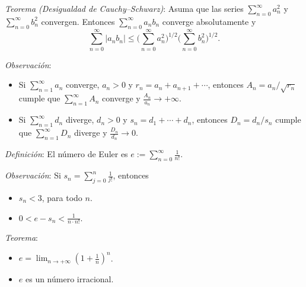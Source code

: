 \documentclass{beamer}
\begin{document}
  \begin{frame}
    \textit{Teorema (Desigualdad de Cauchy--Schwarz)}: Asuma que las series
    $\sum_{n=0}^{\infty} a_n^2$ y $\sum_{n=0}^{\infty} b_n^2$ convergen. Entonces
    $\sum_{n=0}^{\infty} a_n b_n$ converge absolutamente y
    \[
      \sum_{n=0}^{\infty} |a_n b_n| \leq
      \Big( \sum_{n=0}^{\infty} a_n^2 \Big)^{1/2}
      \Big( \sum_{n=0}^{\infty} b_n^2 \Big)^{1/2}.
    \]
    \pause

    \textit{Observación}:
    \begin{itemize}[<+->]
      \item Si $\sum_{n=1}^{\infty} a_n$ converge, $a_n > 0$ y
        $r_n = a_n + a_{n+1} + \cdots$, entonces $A_n = a_n/\sqrt{r_n}$ cumple
        que $\sum_{n=1}^{\infty} A_n$ converge y $\frac{A_n}{a_n} \to +\infty$.
      \item Si $\sum_{n=1}^{\infty} d_n$ diverge, $d_n > 0$ y
        $s_n = d_1 + \cdots + d_n$, entonces $D_n = d_n/s_n$ cumple que
        $\sum_{n=1}^{\infty} D_n$ diverge y $\frac{D_n}{d_n} \to 0$.
    \end{itemize}
  \end{frame}

  \begin{frame}
    \textit{Definición}: El número de Euler es
    $e := \sum_{n=0}^{\infty} \frac{1}{n!}$.
    \newline\newline
    \pause

    \textit{Observación}: Si $s_n = \sum_{j=0}^{n} \frac{1}{j!}$, entonces
    \begin{itemize}[<+->]
      \item $s_n < 3$, para todo $n$.
      \item $0 < e - s_n < \frac{1}{n \cdot n!}$.
    \end{itemize}
    \vspace{0.3cm}
    \pause

    \textit{Teorema}:
    \begin{itemize}[<+->]
      \item $e = \lim_{n \to +\infty} \left( 1 + \frac{1}{n} \right)^n$.
      \item $e$ es un número irracional.
    \end{itemize}
  \end{frame}
\end{document}

